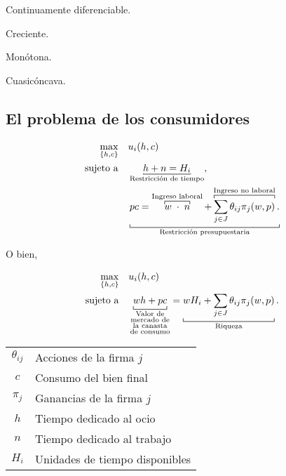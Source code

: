 \documentclass[8pt,a4paper]{extarticle}
\begin{document}
\begin{multicols}{3}
\begin{eqlist}
\item Continuamente diferenciable.
\item Creciente.
\item Monótona.
\item Cuasicóncava.
\end{eqlist}

\subsection{El problema de los consumidores}

\begin{equation*}
\begin{aligned}
	\max_{\{h, c\}} \quad & u_i(h, c) \\
	\text{sujeto a} \quad & \underbracket[0.5pt][0.5pt]{h + n = H_i}_{\text{\normalfont Restricción de tiempo}}, \\
						  & \underbracket[0.5pt]{pc = \overbracket[0.5pt]{w \; \cdot \;  n}^{\text{\normalfont Ingreso laboral}} + \overbracket[0.5pt]{\sum_{j \in J} \theta_{ij} \pi_j (w, p)}^{\text{\normalfont Ingreso no laboral}}.}_{\text{\normalfont Restricción presupuestaria}}
\end{aligned}
\end{equation*}

O bien,

\begin{equation*}
\begin{aligned}
	\max_{\{h, c\}} \quad & u_i(h, c) \\
	\text{sujeto a} \quad & \underbracket[0.5pt]{wh + pc}_{\substack{\text{\normalfont Valor de} \\ \text{\normalfont mercado de} \\ \text{\normalfont la canasta} \\\text{\normalfont de consumo} }} = \underbracket[0.5pt]{wH_i + \sum_{j \in J} \theta_{ij} \pi_j (w, p)}_{\text{\normalfont Riqueza}}.
\end{aligned}
\end{equation*}

\begin{center}
\begin{tabular}{ c l }
	\hline
	$\theta_{ij}$ & Acciones de la firma $j$ \\
	$c$           & Consumo del bien final \\
	$\pi_j$       & Ganancias de la firma $j$ \\
	$h$           & Tiempo dedicado al ocio \\
	$n$           & Tiempo dedicado al trabajo \\
	$H_i$         & Unidades de tiempo disponibles \\
	\hline
\end{tabular}
\end{center}


\end{multicols}
\end{document}
